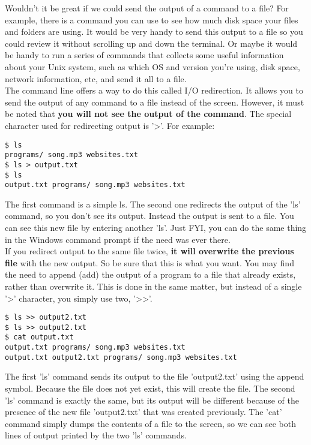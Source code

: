 Wouldn't it be great if we could send the output of a command to a file?  For example, there is a command you can use to see how much disk space your files and folders are using.  It would be very handy to send this output to a file so you could review it without scrolling up and down the terminal.  Or maybe it would be handy to run a series of commands that collects some useful information about your Unix system, such as which OS and version you're using, disk space, network information, etc, and send it all to a file.\\

The command line offers a way to do this called I/O redirection.  It allows you to send the output of any command to a file instead of the screen.  However, it must be noted that \textbf{you will not see the output of the command}.  The special character used for redirecting output is '\textgreater'.  For example:

\begin{verbatim}
$ ls
programs/ song.mp3 websites.txt
$ ls > output.txt
$ ls
output.txt programs/ song.mp3 websites.txt
\end{verbatim}

The first command is a simple ls.  The second one redirects the output of the 'ls' command, so you don't see its output.  Instead the output is sent to a file.  You can see this new file by entering another 'ls'.  Just FYI, you can do the same thing in the Windows command prompt if the need was ever there.\\

If you redirect output to the same file twice, \textbf{it will overwrite the previous file} with the new output.  So be sure that this is what you want.  You may find the need to append (add) the output of a program to a file that already exists, rather than overwrite it.  This is done in the same matter, but instead of a single '\textgreater' character, you simply use two, '\textgreater\textgreater'.

\begin{verbatim}
$ ls >> output2.txt
$ ls >> output2.txt
$ cat output.txt
output.txt programs/ song.mp3 websites.txt
output.txt output2.txt programs/ song.mp3 websites.txt
\end{verbatim}

The first 'ls' command sends its output to the file 'output2.txt' using the append symbol.  Because the file does not yet exist, this will create the file.  The second 'ls' command is exactly the same, but its output will be different because of the presence of the new file 'output2.txt' that was created previously.  The 'cat' command simply dumps the contents of a file to the screen, so we can see both lines of output printed by the two 'ls' commands.\\

